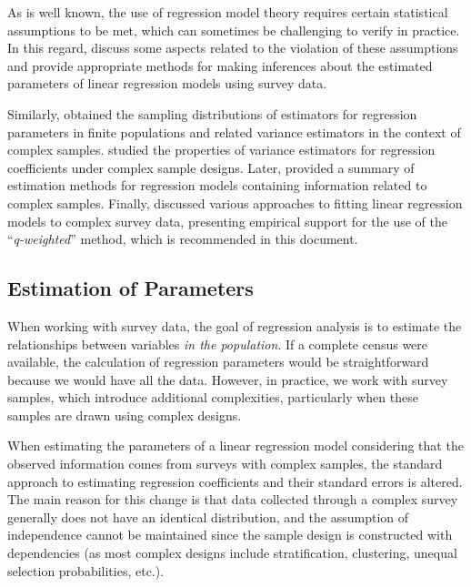 \documentclass[
  12pt,
]{book}
\begin{document}
As is well known, the use of regression model theory requires certain statistical assumptions to be met, which can sometimes be challenging to verify in practice. In this regard, \citet{shah1977inference} discuss some aspects related to the violation of these assumptions and provide appropriate methods for making inferences about the estimated parameters of linear regression models using survey data.

Similarly, \citet{binder1983variances} obtained the sampling distributions of estimators for regression parameters in finite populations and related variance estimators in the context of complex samples. \citet{skinner1989analysis} studied the properties of variance estimators for regression coefficients under complex sample designs. Later, \citet{fuller2002regression} provided a summary of estimation methods for regression models containing information related to complex samples. Finally, \citet{pfeffermann2011modelling} discussed various approaches to fitting linear regression models to complex survey data, presenting empirical support for the use of the ``\emph{q-weighted}'' method, which is recommended in this document.

\hypertarget{estimation-of-parameters}{%
\subsection{Estimation of Parameters}\label{estimation-of-parameters}}

When working with survey data, the goal of regression analysis is to estimate the relationships between variables \emph{in the population}. If a complete census were available, the calculation of regression parameters would be straightforward because we would have all the data. However, in practice, we work with survey samples, which introduce additional complexities, particularly when these samples are drawn using complex designs.

When estimating the parameters of a linear regression model considering that the observed information comes from surveys with complex samples, the standard approach to estimating regression coefficients and their standard errors is altered. The main reason for this change is that data collected through a complex survey generally does not have an identical distribution, and the assumption of independence cannot be maintained since the sample design is constructed with dependencies (as most complex designs include stratification, clustering, unequal selection probabilities, etc.).
\end{document}
